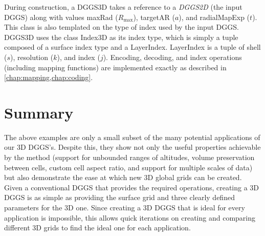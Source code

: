 During construction, a DGGS3D takes a reference to a \textit{DGGS2D} (the input DGGS) along with values maxRad ($R_\mathrm{max}$), targetAR ($a$), and radialMapExp ($t$).
This class is also templated on the type of index used by the input DGGS.
DGGS3D uses the class Index3D as its index type, which is simply a tuple composed of a surface index type and a LayerIndex.
LayerIndex is a tuple of shell ($s$), resolution ($k$), and index ($j$).
Encoding, decoding, and index operations (including mapping functions) are implemented exactly as described in \cref{chap:mapping,chap:coding}.


\section{Summary}
The above examples are only a small subset of the many potential applications of our 3D DGGS's.
Despite this, they show not only the useful properties achievable by the method (support for unbounded ranges of altitudes, volume preservation between cells, custom cell aspect ratio, and support for multiple scales of data) but also demonstrate the ease at which new 3D global grids can be created.
Given a conventional DGGS that provides the required operations, creating a 3D DGGS is as simple as providing the surface grid and three clearly defined parameters for the 3D one.
Since creating a 3D DGGS that is ideal for every application is impossible, this allows quick iterations on creating and comparing different 3D grids to find the ideal one for each application.
